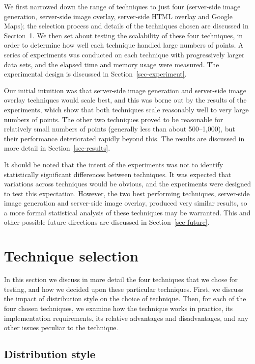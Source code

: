 \documentclass[acmtocl,acmnow]{acmtrans2m}
\begin{document}
We first narrowed down the range of techniques to just four (server-side
image generation, server-side image overlay, server-side HTML overlay
and Google Maps); the selection process and details of the techniques
chosen are discussed in Section~\ref{sec-techniques}. We then set about
testing the scalability of these four techniques, in order to determine
how well each technique handled large numbers of points. A series of
experiments was conducted on each technique with progressively larger
data sets, and the elapsed time and memory usage were measured. The
experimental design is discussed in Section~\ref{sec-experiment}.

Our initial intuition was that server-side image generation and
server-side image overlay techniques would scale best, and this was
borne out by the results of the experiments, which show that both
techniques scale reasonably well to very large numbers of points. The
other two techniques proved to be reasonable for relatively small
numbers of points (generally less than about 500--1,000), but their
performance deteriorated rapidly beyond this. The results are discussed
in more detail in Section~\ref{sec-results}.

It should be noted that the intent of the experiments was not to
identify statistically significant differences between techniques. It
was expected that variations across techniques would be obvious, and the
experiments were designed to test this expectation. However, the two
best performing techniques, server-side image generation and server-side
image overlay, produced very similar results, so a more formal
statistical analysis of these techniques may be warranted. This and
other possible future directions are discussed in
Section~\ref{sec-future}.


\section{Technique selection}
\label{sec-techniques}

In this section we discuss in more detail the four techniques that we
chose for testing, and how we decided upon these particular techniques.
First, we discuss the impact of distribution style on the choice of
technique. Then, for each of the four chosen techniques, we examine how
the technique works in practice, its implementation requirements, its
relative advantages and disadvantages, and any other issues peculiar to
the technique.


\subsection{Distribution style}
\label{sec-distribution}
\end{document}
